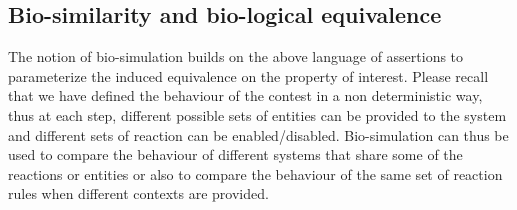 \subsection{Bio-similarity and bio-logical equivalence}

The notion of bio-simulation builds on the above language of assertions to parameterize the induced equivalence on the property of interest. 
Please recall that we have defined the behaviour of the contest in a non deterministic way, thus 
at each step, different possible sets of entities can be provided to the system and different sets of reaction can be enabled/disabled. 
Bio-simulation can thus be used to compare the behaviour of different systems that share some of the reactions or entities or also to compare the behaviour of the same set of reaction rules when different contexts are provided.



